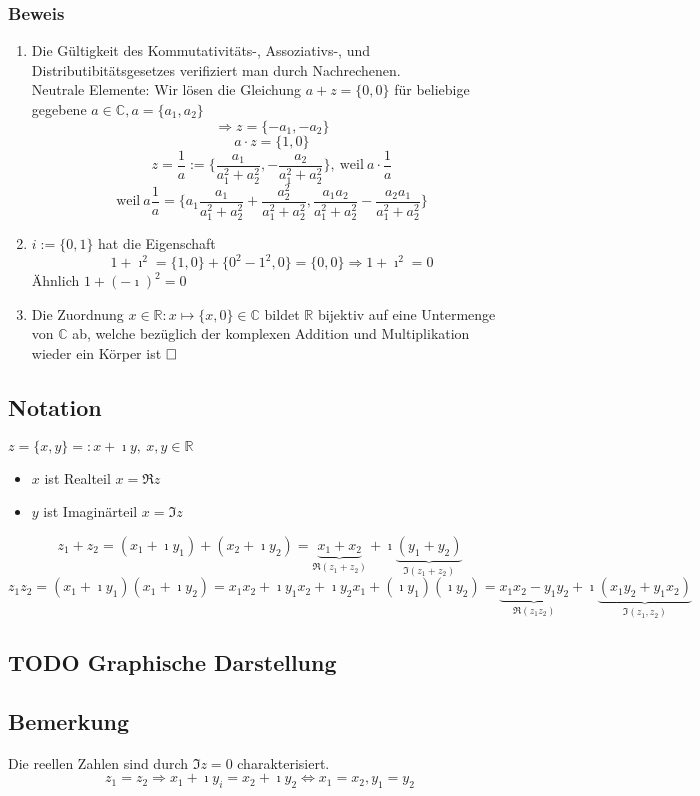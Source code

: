 \documentclass[a4paper]{scrartcl}
\newcommand{\I}{\ensuremath{\imath}}%
\begin{document}
\subsubsection{Beweis}
\label{sec-3-1-1}
\begin{enumerate}
\item Die Gültigkeit des Kommutativitäts-, Assoziativs-, und Distributibitätsgesetzes verifiziert man durch Nachrechenen. \\
       Neutrale Elemente: Wir lösen die Gleichung $a + z = \{0,0\}$ für beliebige gegebene $a\in\mathbb{C},a=\{a_1,a_2\}$
       \[\Rightarrow z = \{-a_1, -a_2\}\]
       \[a\cdot z = \{1,0\}\]
       \[z = \frac{1}{a}:=\{\frac{a_1}{a_1^2 + a_2^2},-\frac{a_2}{a_1^2 + a_2^2}\},~\text{weil}~a\cdot\frac{1}{a}\]
       \[\text{weil}~a\frac{1}{a}=\{a_1\frac{a_1}{a_1^2 + a_2^2} + \frac{a_2^2}{a_1^2 + a_2^2},\frac{a_1 a_2}{a_1^2 + a_2^2} - \frac{a_2 a_1}{a_1^2 + a_2^2}\}\]
\item $i:= \{0,1\}$ hat die Eigenschaft
\[1 + \I^2 = \{1,0\} + \{0^2 - 1^2, 0\} = \{0,0\} \Rightarrow 1+\I^2 = 0\]
Ähnlich $1 + (-\I)^2 = 0$
\item Die Zuordnung $x\in\mathbb{R}:x\mapsto\{x,0\}\in\mathbb{C}$ bildet $\mathbb{R}$ bijektiv auf eine Untermenge von $\mathbb{C}$ ab, welche bezüglich der komplexen Addition und Multiplikation wieder ein Körper ist $\hfill\square$
\end{enumerate}
\subsection{Notation}
\label{sec-3-2}
$z = \{x,y\} =: x + \I y,~x,y\in\mathbb{R}$
\begin{itemize}
\item $x$ ist Realteil $x = \Re{z}$
\item $y$ ist Imaginärteil $x = \Im{z}$
\end{itemize}
\[z_1 + z_2 = (x_1 + \I y_1) + (x_2 + \I y_2) = \underbrace{x_1 + x_2}_{\Re (z_1 + z_2)} + \I\underbrace{(y_1 + y_2)}_{\Im (z_1 + z_2)}\]
\[z_1 z_2 = (x_1 + \I y_1)(x_1 + \I y_2) = x_1 x_2 + \I y_1 x_2 + \I y_2 x_1 + (\I y_1)(\I y_2) = \underbrace{x_1 x_2 - y_1 y_2}_{\Re (z_1 z_2)} + \I\underbrace{(x_1y_2 + y_1 x_2)}_{\Im (z_1,z_2)}\]
\subsection{{\bfseries\sffamily TODO} Graphische Darstellung}
\label{sec-3-3}
\subsection{Bemerkung}
\label{sec-3-4}
Die reellen Zahlen  sind durch $\Im z = 0$ charakterisiert.
\[z_1 = z_2 \Rightarrow x_1 + \I y_i = x_2 + \I y_2 \Leftrightarrow x_1 = x_2,y_1 = y_2\]
\end{document}
